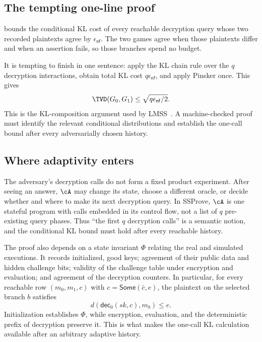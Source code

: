 \subsection{The tempting one-line proof}
\label{sec:paid-hop}

 bounds the conditional KL cost of every reachable
decryption query whose two recorded plaintexts agree by
\(\epsilon_{\mathsf{nf}}\).
The two games agree when those plaintexts differ and when an assertion fails,
so those branches spend no budget.

It is tempting to finish in one sentence:
apply the KL chain rule over the \(q\) decryption interactions, obtain total KL cost
\(q\epsilon_{\mathsf{nf}}\), and apply Pinsker once.
This gives
\begin{equation}
\label{eq:central-game-hop}
 \TVD(G_0,G_1)
 \leq \sqrt{q\epsilon_{\mathsf{nf}}/2}.
\end{equation}
This is the KL-composition argument used by LMSS~\cite{lmss}.
A machine-checked proof must identify the relevant conditional distributions
and establish the one-call bound after every adversarially chosen history.

\subsection{Where adaptivity enters}
\label{sec:adaptive-invariant}

The adversary's decryption calls do not form a fixed product experiment.
After seeing an answer, \(\cA\) may change its state, choose a different oracle,
or decide whether and where to make its next decryption query.
In SSProve, \(\cA\) is one stateful program with calls embedded in its control
flow, not a list of \(q\) pre-existing query phases.
Thus ``the first \(q\) decryption calls'' is a semantic notion, and the
conditional KL bound must hold after every reachable history.

The proof also depends on a state invariant \(\Phi\) relating the real and
simulated executions.
It records initialized, good keys; agreement of their public data and hidden
challenge bits; validity of the challenge table under encryption and
evaluation; and agreement of the decryption counters.
In particular, for every reachable row
\((m_0,m_1,c)\) with \(c=\mathsf{Some}(\bar c,e)\), the plaintext on the
selected branch \(b\) satisfies
\[
 d(\mathsf{dec}_0(sk,c),m_b)\leq e.
\]
Initialization establishes \(\Phi\), while encryption, evaluation, and the
deterministic prefix of decryption preserve it.
This is what makes the one-call KL calculation available after an arbitrary
adaptive history.


